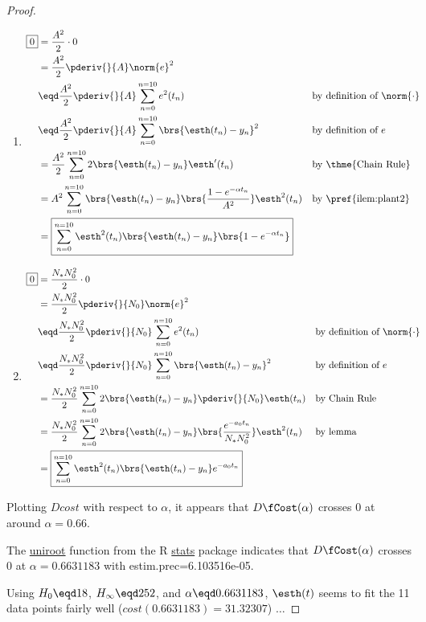 \begin{proof}
\begin{enumerate}
  \item 
    \begin{align*}
    \boxed{0}
      &= \frac{A^2}{2}\cdot0
    \\&=\frac{A^2}{2}
         \pderiv{}{A}\norm{e}^2
    \\&\eqd \frac{A^2}{2}
         \pderiv{}{A}\sum_{n=0}^{n=10}e^2(t_n)
      && \text{by definition of $\norm{\cdot}$}
    \\&\eqd \frac{A^2}{2}
         \pderiv{}{A}\sum_{n=0}^{n=10}\brs{\esth(t_n)-y_n}^2
      && \text{by definition of $e$}
    \\&= \frac{A^2}{2}
         \sum_{n=0}^{n=10}2\brs{\esth(t_n)-y_n}\esth'(t_n)
      && \text{by \thme{Chain Rule}}
    \\&= A^2
         \sum_{n=0}^{n=10}  \brs{\esth(t_n)-y_n}
                            \brs{\frac{1 - e^{-\alpha t_n}}{A^2}} \esth^2(t_n)
      && \text{by \pref{ilem:plant2}}
    \\&= \boxed{\sum_{n=0}^{n=10} \esth^2(t_n) \brs{\esth(t_n)-y_n} \brs{1 - e^{-\alpha t_n} }}
    \end{align*}

  \item 
    \begin{align*}
    \boxed{0}
      &= \frac{N_*N_0^2}{2}\cdot0
    \\&=\frac{N_*N_0^2}{2}
         \pderiv{}{N_0}\norm{e}^2
    \\&\eqd \frac{N_*N_0^2}{2}
         \pderiv{}{N_0}\sum_{n=0}^{n=10}e^2(t_n)
      && \text{by definition of $\norm{\cdot}$}
    \\&\eqd \frac{N_*N_0^2}{2}
         \pderiv{}{N_0}\sum_{n=0}^{n=10}\brs{\esth(t_n)-y_n}^2
      && \text{by definition of $e$}
    \\&= \frac{N_*N_0^2}{2}
         \sum_{n=0}^{n=10}2\brs{\esth(t_n)-y_n} \pderiv{}{N_0}\esth(t_n)
      && \text{by Chain Rule}
    \\&= \frac{N_*N_0^2}{2}
         \sum_{n=0}^{n=10}2\brs{\esth(t_n)-y_n} \brs{ \frac{e^{-a_0 t_n}}{N_*N_0^2}}\esth^2(t_n)
      && \text{by lemma}
    \\&= \boxed{\sum_{n=0}^{n=10} \esth^2(t_n)\brs{\esth(t_n)-y_n} e^{-a_0 t_n} }
    \end{align*}
\end{enumerate}

Plotting $Dcost$ with respect to $\alpha $, it appears that $D\fCost(\alpha )$ crosses $0$ at around $\alpha =0.66$.

The \href{https://www.rdocumentation.org/packages/stats/versions/3.6.2/topics/uniroot}{uniroot} function from the R 
\href{https://www.rdocumentation.org/packages/stats/versions/3.6.2}{stats} package indicates that $D\fCost(\alpha )$ crosses $0$ 
at $\alpha =0.6631183$\newline
with estim.prec=6.103516e-05.

Using $H_0\eqd18$, $H_{\infty}\eqd252$, and $\alpha \eqd0.6631183$, $\esth(t)$ 
seems to fit the 11 data points fairly well ($cost(0.6631183)=31.32307$) $\ldots$

\end{proof}

